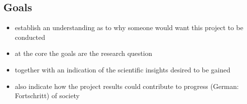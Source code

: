 \subsection{Goals}

\begin{itemize}
    \item establish an understanding as to why someone would want this project to be conducted
    \item at the core the goals are the research question 
    \item together with an indication of the scientific insights desired to be gained
    \item also indicate how the project results could contribute to progress (German: Fortschritt) of society 
\end{itemize}

